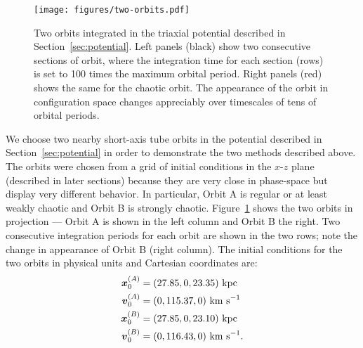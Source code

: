 \documentclass[letterpaper,12pt,preprint]{aastex}
\newcommand{\bs}[1]{\boldsymbol{#1}}
\begin{document}
\begin{figure}[!h]
\begin{center}
\texttt{[image: figures/two-orbits.pdf]}
\caption{ Two orbits integrated in the triaxial potential described in Section~\ref{sec:potential}. Left panels (black) show two consecutive sections of orbit, where the integration time for each section (rows) is set to 100 times the maximum orbital period. Right panels (red) shows the same for the chaotic orbit. The appearance of the orbit in configuration space changes appreciably over timescales of tens of orbital periods. } \label{fig:two-orbits}
\end{center}
\end{figure}

We choose two nearby short-axis tube orbits in the potential described in Section~\ref{sec:potential} in order to demonstrate the two methods described above. The orbits were chosen from a grid of initial conditions in the $x$-$z$ plane (described in later sections) because they are very close in phase-space but display very different behavior. In particular, Orbit A is regular or at least weakly chaotic and Orbit B is strongly chaotic. Figure~\ref{fig:two-orbits} shows the two orbits in projection --- Orbit A is shown in the left column and Orbit B the right. Two consecutive integration periods for each orbit are shown in the two rows; note the change in appearance of Orbit B (right column). The initial conditions for the two orbits in physical units and Cartesian coordinates are:
\begin{align}
	\bs{x}_{0}^{(A)} &= (27.85, 0, 23.35)~{\rm kpc}\\
	\bs{v}_{0}^{(A)} &= (0, 115.37, 0)~{\rm km~s}^{-1}\\
	\bs{x}_{0}^{(B)} &= (27.85, 0, 23.10)~{\rm kpc}\\
	\bs{v}_{0}^{(B)} &= (0, 116.43, 0)~{\rm km~s}^{-1}.
\end{align}
\end{document}
